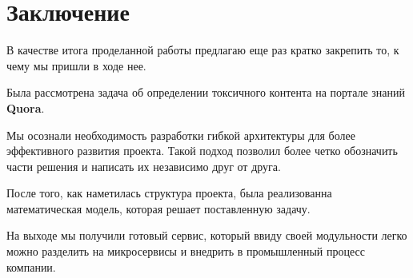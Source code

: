 
\section{Заключение}

В качестве итога проделанной работы предлагаю еще раз кратко закрепить то, к чему мы пришли в ходе нее.

Была рассмотрена задача об определении токсичного контента на портале знаний \textbf{Quora}. 

Мы осознали необходимость разработки гибкой архитектуры для более эффективного развития проекта. Такой подход позволил более четко обозначить части решения и написать их независимо друг от друга. 

После того, как наметилась структура проекта, была реализованна математическая модель, которая решает поставленную задачу. 

На выходе мы получили готовый сервис, который ввиду своей модульности легко можно разделить на микросервисы и внедрить в промышленный процесс компании.
